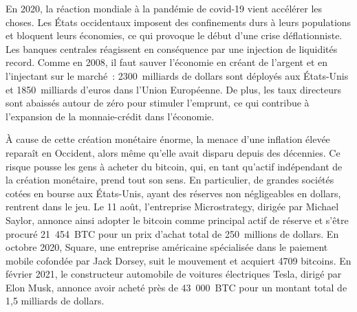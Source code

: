 En 2020, la réaction mondiale à la pandémie de covid-19 vient accélérer les choses. Les États occidentaux imposent des confinements durs à leurs populations et bloquent leurs économies, ce qui provoque le début d'une crise déflationniste. Les banques centrales réagissent en conséquence par une injection de liquidités record. Comme en 2008, il faut sauver l'économie en créant de l'argent et en l'injectant sur le marché~: 2300~milliards de dollars sont déployés aux États-Unis et 1850~milliards d'euros dans l'Union Européenne. De plus, les taux directeurs sont abaissés autour de zéro pour stimuler l'emprunt, ce qui contribue à l'expansion de la monnaie-crédit dans l'économie.

À cause de cette création monétaire énorme, la menace d'une inflation élevée reparaît en Occident, alors même qu'elle avait disparu depuis des décennies. Ce risque pousse les gens à acheter du bitcoin, qui, en tant qu'actif indépendant de la création monétaire, prend tout son sens. En particulier, de grandes sociétés cotées en bourse aux États-Unis, ayant des réserves non négligeables en dollars, rentrent dans le jeu. Le 11 août, l'entreprise Microstrategy, dirigée par Michael Saylor, annonce ainsi adopter le bitcoin comme principal actif de réserve et s'être procuré 21~454~BTC pour un prix d'achat total de 250~millions de dollars. En octobre 2020, Square, une entreprise américaine spécialisée dans le paiement mobile cofondée par Jack Dorsey, suit le mouvement et acquiert 4709 bitcoins. En février 2021, le constructeur automobile de voitures électriques Tesla, dirigé par Elon Musk, annonce avoir acheté près de 43~000~BTC pour un montant total de 1,5 milliards de dollars.


